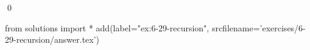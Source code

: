 
\begin{ex}
  \label{ex:6-29-recursion}
  
  \qed
\end{ex}
\begin{python0}
from solutions import *
add(label="ex:6-29-recursion",
    srcfilename='exercises/6-29-recursion/answer.tex')
\end{python0}
